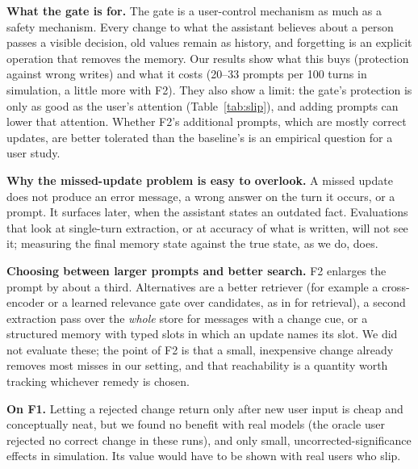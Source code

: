 \IfFileExists{IEEEtran.cls}{\documentclass[journal]{IEEEtran}\def\HAVEIEEE{1}}{\documentclass[10pt,twocolumn]{article}\usepackage[margin=0.7in,columnsep=0.25in]{geometry}}
\begin{document}
\textbf{What the gate is for.} The gate is a user-control mechanism as much as a safety mechanism. Every change to what the assistant believes about a person passes a visible decision, old values remain as history, and forgetting is an explicit operation that removes the memory. Our results show what this buys (protection against wrong writes) and what it costs (20--33 prompts per 100 turns in simulation, a little more with F2). They also show a limit: the gate's protection is only as good as the user's attention (Table~\ref{tab:slip}), and adding prompts can lower that attention. Whether F2's additional prompts, which are mostly correct updates, are better tolerated than the baseline's is an empirical question for a user study.

\textbf{Why the missed-update problem is easy to overlook.} A missed update does not produce an error message, a wrong answer on the turn it occurs, or a prompt. It surfaces later, when the assistant states an outdated fact. Evaluations that look at single-turn extraction, or at accuracy of what is written, will not see it; measuring the final memory state against the true state, as we do, does.

\textbf{Choosing between larger prompts and better search.} F2 enlarges the prompt by about a third. Alternatives are a better retriever (for example a cross-encoder or a learned relevance gate over candidates, as in \cite{zhang2026memgate} for retrieval), a second extraction pass over the \emph{whole} store for messages with a change cue, or a structured memory with typed slots in which an update names its slot. We did not evaluate these; the point of F2 is that a small, inexpensive change already removes most misses in our setting, and that reachability is a quantity worth tracking whichever remedy is chosen.

\textbf{On F1.} Letting a rejected change return only after new user input is cheap and conceptually neat, but we found no benefit with real models (the oracle user rejected no correct change in these runs), and only small, uncorrected-significance effects in simulation. Its value would have to be shown with real users who slip.
\end{document}
